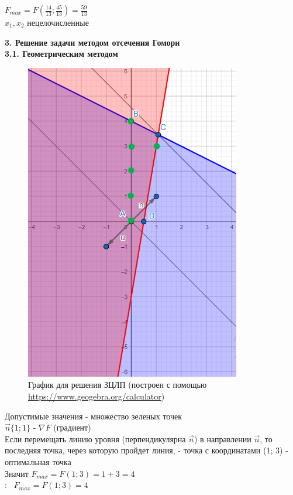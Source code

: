 $F_{max} = F(\frac{14}{13}; \frac{45}{13}) = \frac{59}{13}$\\
$x_1, x_2$ нецелочисленные\\

\begin{flushleft}
    {\bf3. Решение задачи методом отсечения Гомори}\\
    {\bf3.1. Геометрическим методом}\\
\end{flushleft}

\begin{figure}[ht]
\centering
\includegraphics[]{пункт а_1.png}
\centering
\caption{График для решения ЗЦЛП (построен с помощью \url{https://www.geogebra.org/calculator})}
\end{figure}
Допустимые значения - множество зеленых точек\\
$\vec{n}\{1; 1\}$ - $\nabla F$ (градиент)\\
Если перемещать линию уровня (перпендикулярна $\vec{n}$) в направлении $\vec{n}$, то последняя точка, через которую пройдет линия, - точка с координатами (1; 3) - оптимальная точка\\
Значит $F_{max} = F(1; 3) = 1 + 3 = 4$\\
{:~} $F_{max} = F(1; 3) = 4$

